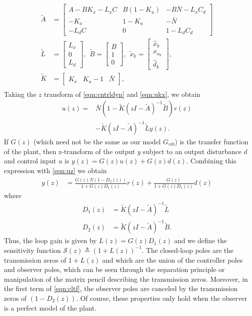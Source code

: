 \documentclass[journal,twocolumn,twoside]{IEEEtran}
\begin{document}
\begin{align*}
  \tilde{A} &= \begin{bmatrix}
    A-BK_x-L_xC & B(1-K_u) & -B\bar{N} - L_xC_d\\
    -K_x        & 1-K_u    & -\bar{N} \\
    -L_dC      & 0        & 1-L_dC_d
  \end{bmatrix}\\
  \tilde{L} &= \begin{bmatrix} L_x \\ 0 \\ L_d  \end{bmatrix},\:\:
  \tilde{B} = \begin{bmatrix} B \\ 1 \\0\end{bmatrix},\:\:
  \tilde{x}_k = \begin{bmatrix} \hat{x}_k \\ x_{u_k} \\ \hat{d}_k\end{bmatrix},\\
  \tilde{K} &= \begin{bmatrix}K_x & K_u-1 & \bar{N}\end{bmatrix},\\
\end{align*}
Taking the $z$ transform of \eqref{eqn:cntrldyn} and \eqref{eqn:ukx}, we obtain
\begin{align}
  u(z) =&  \bar{N}(1-\tilde{K}(zI-\tilde{A})^{-1}\tilde{B})r(z) \label{eqn:uz}\\
       & -\tilde{K}(zI - \tilde{A})^{-1}\tilde{L}y(z).\nonumber
\end{align}
If $G(z)$ (which need not be the same as our model $G_{vib}$) is the transfer function of the plant, then z-transform of the output $y$ subject to an output disturbance $d$ and control input $u$ is $y(z) = G(z)u(z) + G(z)d(z)$. Combining this expression with \eqref{eqn:uz} we obtain 
\begin{align}
  y(z) &= \frac{G(z)\bar{N}(1-D_2(z))}{1 + G(z)D_1(z)} r(z) + \frac{G(z)}{1 + G(z)D_1(z)}d(z)\label{eqn:cltf}
\end{align}
where
\begin{align}
  D_1(z) &= \tilde{K}(zI -\tilde{A})^{-1}\tilde{L}\\
  D_2(z) &= \tilde{K}(zI -\tilde{A})^{-1}\tilde{B}.
\end{align}
Thus, the loop gain is given by $L(z) = G(z)D_1(z)$ and we define the sensitivity function $\mathcal{S}(z)\triangleq (1+L(z))^{-1}$. The closed-loop poles are the transmission zeros of $1+L(z)$ and which are the union of the controller poles and observer poles, which can be seen through the separation principle or manipulation of the matrix pencil describing the transmission zeros. Moreover, in the first term of \eqref{eqn:cltf}, the observer poles are canceled by the transmission zeros of $(1-D_2(z))$. Of course, these properties only hold when the observer is a perfect model of the plant. 
\end{document}
